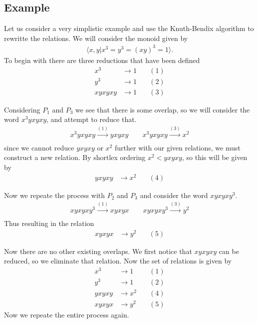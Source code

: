 \documentclass[10pt]{amsart}
\theoremstyle{definition}
\begin{document}
\subsection{Example}%
\label{sub:example}

Let us consider a very simplistic example and use the Knuth-Bendix algorithm to
rewritte the relations. We will consider the monoid given by
\begin{align*}
  \langle x,y\vert x^3=y^3={(xy)}^3=1\rangle.
\end{align*}
To begin with there are three reductions that have been defined
\begin{align*}
  x^3&\rightarrow1\quad&(1)\\
  y^3&\rightarrow1\quad&(2)\\
  xyxyxy&\rightarrow1\quad&(3)
\end{align*}

Considering $P_1$ and $P_3$ we see that there is some overlap, so we will
consider the word $x^3yxyxy$, and attempt to reduce that.
\begin{align*}
  x^3yxyxy\xrightarrow{(1)}yxyxy\quad\quad
  x^3yxyxy\xrightarrow{(3)}x^2\\
\end{align*}
since we cannot reduce $yxyxy$ or $x^2$ further with our given relations, we
must construct a new relation. By shortlex ordering $x^2<yxyxy$, so this will
be given by
\begin{align*}
  yxyxy&\rightarrow x^2\quad&(4)
\end{align*}

Now we repeate the process with $P_2$ and $P_3$ and consider the word
$xyxyxy^3$.
\begin{align*}
  xyxyxy^3\xrightarrow{(1)}xyxyx\quad\quad
  xyxyxy^3\xrightarrow{(3)}y^2\\
\end{align*}
Thus resulting in the relation
\begin{align*}
  xyxyx&\rightarrow y^2\quad&(5)
\end{align*}

Now there are no other existing overlaps. We first notice that $xyxyxy$ can be
reduced, so we eliminate that relation. Now the set of relations is given by
\begin{align*}
  x^3&\rightarrow1\quad&(1)\\
  y^3&\rightarrow1\quad&(2)\\
  yxyxy&\rightarrow x^2\quad&(4)\\
  xyxyx&\rightarrow y^2\quad&(5)
\end{align*}
Now we repeate the entire process again.
\end{document}
